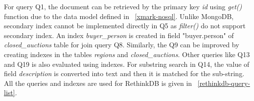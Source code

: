 For query Q1, the document can be retrieved by the primary key \textit{id} using \textit{get()} function due to the data model defined in ~\ref{xmark-nosql}. Unlike MongoDB, secondary index cannot be implemented directly in Q5 as \textit{filter()} do not support secondary index. An index \textit{buyer\_person} is created in field "buyer.person" of \textit{closed\_auctions} table for join query Q8. Similarly, the Q9 can be improved by creating indexes in the tables \textit{regions} and \textit{closed\_auctions}. Other queries like Q13 and Q19 is also evaluated using indexes. For substring search in Q14, the value of  field \textit{description} is converted into text and then it is matched for the sub-string. All the queries and indexes are used for RethinkDB is given in ~\ref{rethinkdb-query-list}.
